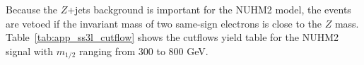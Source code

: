 
Because the $Z$+jets background is important for the NUHM2 model, the events are vetoed if the invariant mass of two same-sign electrons is close to the $Z$ mass.
Table~\ref{tab:app_ss3l_cutflow} shows the cutflows yield table for the NUHM2 signal with $m_{1/2}$ ranging from 300 to 800 GeV.


